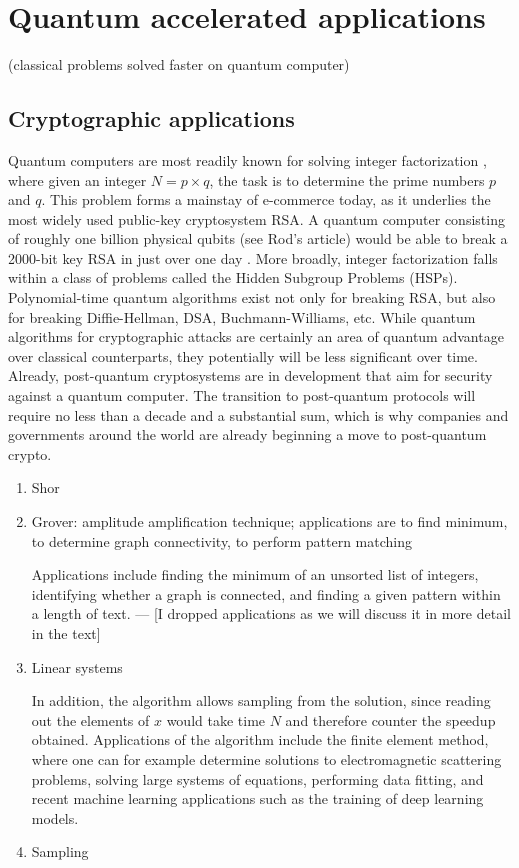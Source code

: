 \documentclass[journal]{IEEEtran}
\begin{document}
\section{Quantum accelerated applications}
 (classical problems solved faster on quantum computer)
\subsection{Cryptographic applications}
Quantum computers are most readily known for solving integer factorization \cite{}, where given an integer $N=p\times q$, the task is to determine the prime numbers $p$ and $q$.  This problem forms a mainstay of e-commerce today, as it underlies the most widely used public-key cryptosystem RSA.  A quantum computer consisting of roughly one billion physical qubits (see Rod's article) would be able to break a 2000-bit key RSA in just over one day \cite{}.  More broadly, integer factorization falls within a class of problems called the Hidden Subgroup Problems (HSPs).  Polynomial-time quantum algorithms exist not only for breaking RSA, but also for breaking Diffie-Hellman, DSA, Buchmann-Williams, etc.
While quantum algorithms for cryptographic attacks are certainly an area of quantum advantage over classical counterparts, they potentially will be less significant over time.  Already, post-quantum cryptosystems are in development that aim for security against a quantum computer.  The transition to post-quantum protocols will require no less than a decade and a substantial sum, which is why companies and governments around the world are already beginning a move to post-quantum crypto.  


\begin{enumerate}
\item    Shor


\item    Grover: amplitude amplification technique; applications are to find minimum, to determine graph connectivity, to perform pattern matching

Applications include finding the minimum of an unsorted list of integers, identifying whether a graph is connected, and finding a given pattern within a length of text. --- [I dropped applications as we will discuss it in more detail in the text]



\item     Linear systems

In addition, the algorithm allows sampling from the solution, since reading out the elements of $x$ would take time $N$ and therefore counter the speedup obtained.
Applications of the algorithm include the finite element method, where one can for example determine solutions to electromagnetic scattering problems, solving large systems of equations, performing data fitting, and recent machine learning applications such as the training of deep learning models.


\item    Sampling
\end{enumerate}
\end{document}
